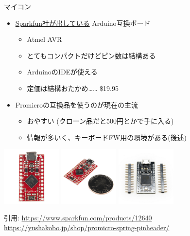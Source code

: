 \documentclass[cjk,dvipdfmx,10pt,compress,fragile%
hyperref={bookmarks=true,bookmarksnumbered=true,bookmarksopen=false,%
colorlinks=false,%
pdftitle={第 134 回 関西 Debian 勉強会},%
pdfauthor={小林},%
pdfsubject={資料},%
}]{beamer}
\begin{document}
\begin{frame}[fragile,t]{マイコン}
 \begin{itemize}
  \item \href{https://www.sparkfun.com/products/12640}{Sparkfun社が出している} Arduino互換ボード
	\begin{itemize}
	 \item Atmel AVR
	 \item とてもコンパクトだけどピン数は結構ある
	 \item ArduinoのIDEが使える
	 \item 定価は結構おたかめ…… \$19.95
	\end{itemize}
  \item Promicroの互換品を使うのが現在の主流
	\begin{itemize}
	 \item おやすい (クローン品だと500円とかで手に入る)
	 \item 情報が多いく、キーボードFW用の環境がある(後述)
	\end{itemize}
 \end{itemize}
\begin{center}
 \includegraphics[keepaspectratio,height=3cm]{./img/promicro_01.jpg}
 \hspace*{1zw}
 \includegraphics[keepaspectratio,height=3cm]{./img/promicro_02.jpg}
 \hspace*{1zw}
 \includegraphics[keepaspectratio,height=3cm]{./img/promicro_compat.jpg}
 \vspace*{-1zw}
\end{center}
\begin{flushright}
 {\footnotesize 引用: \url{https://www.sparkfun.com/products/12640}\\[-.5zw]
 \url{https://yushakobo.jp/shop/promicro-spring-pinheader/}}
\end{flushright}
\end{frame}
\end{document}
